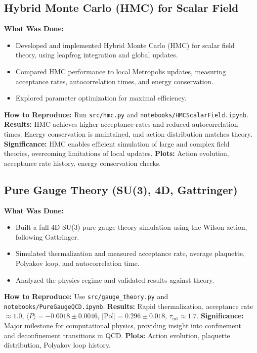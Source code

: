 \documentclass[12pt]{article}
\begin{document}
\subsection{Hybrid Monte Carlo (HMC) for Scalar Field}
\textbf{What Was Done:}
\begin{itemize}
    \item Developed and implemented Hybrid Monte Carlo (HMC) for scalar field theory, using leapfrog integration and global updates.
    \item Compared HMC performance to local Metropolis updates, measuring acceptance rates, autocorrelation times, and energy conservation.
    \item Explored parameter optimization for maximal efficiency.
\end{itemize}
\textbf{How to Reproduce:} Run \texttt{src/hmc.py} and \texttt{notebooks/HMCScalarField.ipynb}.
\textbf{Results:} HMC achieves higher acceptance rates and reduced autocorrelation times. Energy conservation is maintained, and action distribution matches theory.
\textbf{Significance:} HMC enables efficient simulation of large and complex field theories, overcoming limitations of local updates.
\textbf{Plots:} Action evolution, acceptance rate history, energy conservation checks.

\subsection{Pure Gauge Theory (SU(3), 4D, Gattringer)}
\textbf{What Was Done:}
\begin{itemize}
    \item Built a full 4D SU(3) pure gauge theory simulation using the Wilson action, following Gattringer.
    \item Simulated thermalization and measured acceptance rate, average plaquette, Polyakov loop, and autocorrelation time.
    \item Analyzed the physics regime and validated results against theory.
\end{itemize}
\textbf{How to Reproduce:} Use \texttt{src/gauge\_theory.py} and \texttt{notebooks/PureGaugeQCD.ipynb}.
\textbf{Results:} Rapid thermalization, acceptance rate $\approx 1.0$, $\langle P \rangle = -0.0018 \pm 0.0046$, $|\text{Pol}| = 0.296 \pm 0.018$, $\tau_{\text{int}} \approx 1.7$.
\textbf{Significance:} Major milestone for computational physics, providing insight into confinement and deconfinement transitions in QCD.
\textbf{Plots:} Action evolution, plaquette distribution, Polyakov loop history.
\end{document}
